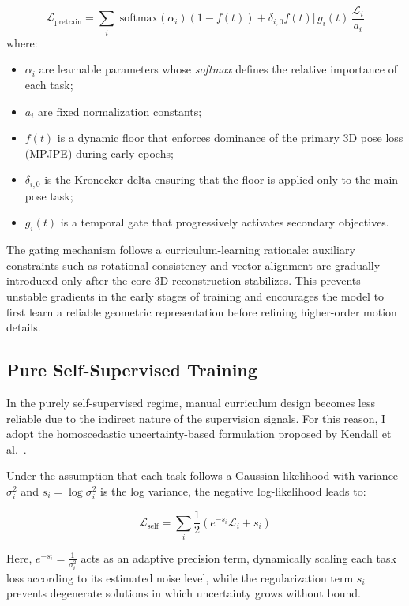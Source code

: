 \begin{equation}
\mathcal{L}_{\text{pretrain}} = \sum_{i} \Big[\mathrm{softmax}(\alpha_i) (1 - f(t)) + \delta_{i,0} f(t) \Big]
\, g_i(t)
\, \frac{\mathcal{L}_i}{a_i}
\end{equation}
where:
\begin{itemize}
    \item $\alpha_i$ are learnable parameters whose \textit{softmax} defines the relative importance of each task;
    \item $a_i$ are fixed normalization constants;
    \item $f(t)$ is a dynamic floor that enforces dominance of the primary 3D pose loss (MPJPE) during early epochs;
    \item $\delta_{i,0}$ is the Kronecker delta ensuring that the floor is applied only to the main pose task;
    \item $g_i(t)$ is a temporal gate that progressively activates secondary objectives.
\end{itemize}

The gating mechanism follows a curriculum-learning rationale: auxiliary constraints such as rotational consistency and vector alignment are gradually introduced only after the core 3D reconstruction stabilizes. 
This prevents unstable gradients in the early stages of training and encourages the model to first learn a reliable geometric representation before refining higher-order motion details.

\subsection{Pure Self-Supervised Training}
\label{sec:loss_self}
In the purely self-supervised regime, manual curriculum design becomes less reliable due to the indirect nature of the supervision signals. 
For this reason, I adopt the homoscedastic uncertainty-based formulation proposed by Kendall et al.~\cite{kendall2018multi}.

Under the assumption that each task follows a Gaussian likelihood with variance $\sigma_i^2$ and $s_i = \log \sigma_i^2$ is the log variance, the negative log-likelihood leads to:

\begin{equation}
\mathcal{L}_{\text{self}} =
\sum_{i}
\frac{1}{2}
\left(
e^{-s_i}\mathcal{L}_i + s_i
\right)
\end{equation}

Here, $e^{-s_i} = \frac{1}{\sigma_i^2}$ acts as an adaptive precision term, dynamically scaling each task loss according to its estimated noise level, while the regularization term $s_i$ prevents degenerate 
solutions in which uncertainty grows without bound.

